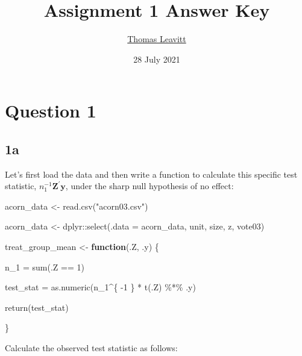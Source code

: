 \documentclass[
  12pt,
  leqno]{article}
\title{Assignment 1 Answer Key}
\author{\href{mailto:tl2624@columbia.edu}{Thomas Leavitt}}
\date{28 July 2021}
\newenvironment{Shaded}{\begin{snugshade}}{\end{snugshade}}
\newcommand{\AttributeTok}[1]{\textcolor[rgb]{0.77,0.63,0.00}{#1}}
\newcommand{\ControlFlowTok}[1]{\textcolor[rgb]{0.13,0.29,0.53}{\textbf{#1}}}
\newcommand{\DecValTok}[1]{\textcolor[rgb]{0.00,0.00,0.81}{#1}}
\newcommand{\FunctionTok}[1]{\textcolor[rgb]{0.00,0.00,0.00}{#1}}
\newcommand{\NormalTok}[1]{#1}
\newcommand{\OtherTok}[1]{\textcolor[rgb]{0.56,0.35,0.01}{#1}}
\newcommand{\SpecialCharTok}[1]{\textcolor[rgb]{0.00,0.00,0.00}{#1}}
\newcommand{\StringTok}[1]{\textcolor[rgb]{0.31,0.60,0.02}{#1}}
\DeclareMathOperator{\1}{\mathbbm{1}}
\begin{document}
\maketitle

\section*{Question 1}

\subsection*{1a}

Let's first load the data and then write a function to calculate this
specific test statistic, \(n_1^{-1}\mathbf{Z}^{\prime}\mathbf{y}\),
under the sharp null hypothesis of no effect:

\scriptsize

\begin{Shaded}
\begin{Highlighting}[]
\NormalTok{acorn\_data }\OtherTok{\textless{}{-}} \FunctionTok{read.csv}\NormalTok{(}\StringTok{"acorn03.csv"}\NormalTok{)}

\NormalTok{acorn\_data }\OtherTok{\textless{}{-}}\NormalTok{ dplyr}\SpecialCharTok{::}\FunctionTok{select}\NormalTok{(}\AttributeTok{.data =}\NormalTok{ acorn\_data, unit, size, z, vote03)}

\NormalTok{treat\_group\_mean }\OtherTok{\textless{}{-}} \ControlFlowTok{function}\NormalTok{(.Z, .y) \{}

\NormalTok{    n\_1 }\OtherTok{=} \FunctionTok{sum}\NormalTok{(.Z }\SpecialCharTok{==} \DecValTok{1}\NormalTok{)}

\NormalTok{    test\_stat }\OtherTok{=} \FunctionTok{as.numeric}\NormalTok{(n\_1}\SpecialCharTok{\^{}}\NormalTok{\{}
        \SpecialCharTok{{-}}\DecValTok{1}
\NormalTok{    \} }\SpecialCharTok{*} \FunctionTok{t}\NormalTok{(.Z) }\SpecialCharTok{\%*\%}\NormalTok{ .y)}

    \FunctionTok{return}\NormalTok{(test\_stat)}

\NormalTok{\}}
\end{Highlighting}
\end{Shaded}

\normalsize

Calculate the observed test statistic as follows: \scriptsize

\begin{Shaded}
\end{Shaded}
\end{document}
